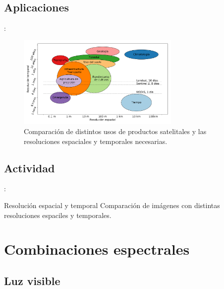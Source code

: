 \documentclass[aspectratio=169]{beamer}
\begin{document}
\subsection{Aplicaciones}

\begin{frame}{\secname : \subsecname}
    \begin{figure}[h!]
        \centering
        \includegraphics[width=0.7\textwidth]{fig:evst.png}
        \caption{Comparación de distintos usos de productos satelitales y las resoluciones espaciales y temporales necesarias.}
        \label{fig:evst}
    \end{figure}
\end{frame}

\subsection{Actividad}

\begin{frame}{\secname : \subsecname}
    \begin{alertblock}{Resolución espacial y temporal}
        Comparación de imágenes con distintas resoluciones espaciles y temporales.
    \end{alertblock}
\end{frame}


\section{Combinaciones espectrales}
\subsection{Luz visible}
\end{document}
